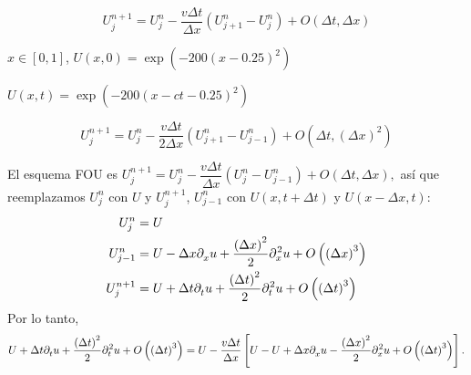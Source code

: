 \begin{example}
	\begin{equation*}
		U^{n+1}_{j}=
		U^{n}_{j}-
		\dfrac{v\Delta t}{\Delta x}
		\left(U^{n}_{j+1}-U^{n}_{j}\right)+
		O\left(\Delta t,\Delta x\right)
	\end{equation*}
\end{example}


$x\in\left[0,1\right]$, $U\left(x,0\right)=\exp\left(-200{\left(x-0.25\right)}^{2}\right)$

$U\left(x,t\right)=\exp\left(-200{\left(x-ct-0.25\right)}^{2}\right)$

\begin{example}
	\begin{equation*}
		U^{n+1}_{j}=
		U^{n}_{j}-
		\dfrac{v\Delta t}{2\Delta x}
		\left(U^{n}_{j+1}-U^{n}_{j-1}\right)+
		O\left(\Delta t,{\left(\Delta x\right)}^{2}\right)
	\end{equation*}
\end{example}

El esquema FOU es
\begin{math}
	U^{n+1}_{j}=
	U^{n}_{j}-
	\dfrac{v\Delta t}{\Delta x}
	\left(U^{n}_{j}-U^{n}_{j-1}\right)+
	O\left(\Delta t,\Delta x\right),
\end{math}
así que reemplazamos $U^{n}_{j}$ con $U$ y $U^{n+1}_{j}$, $U^{n}_{j-1}$ con $U\left(x, t+\Delta t\right)$ y $U\left(x-\Delta x, t\right)$:
\begin{align*}
	U^{n}_{j}   & =
	U                                         \\
	U^{n}_{j-1} & =
	U-
	\Delta x\difcp{u}{x}+
	\dfrac{{\left(\Delta x\right)}^{2}}{2}
	\difcp[2]{u}{x}+
	O\left({\left(\Delta x\right)}^{3}\right) \\
	U^{n+1}_{j} & =
	U+
	\Delta t\difcp{u}{t}+
	\dfrac{{\left(\Delta t\right)}^{2}}{2}
	\difcp[2]{u}{t}+
	O\left({\left(\Delta t\right)}^{3}\right)
\end{align*}
Por lo tanto,
\begin{equation*}
	U+
	\Delta t\difcp{u}{t}+
	\dfrac{{\left(\Delta t\right)}^{2}}{2}
	\difcp[2]{u}{t}+
	O\left({\left(\Delta t\right)}^{3}\right)=
	U-
	\dfrac{v\Delta t}{\Delta x}
	\left[
		U-
		U+
		\Delta x \difcp{u}{x}-
		\dfrac{{\left(\Delta x\right)}^{2}}{2}\difcp[2]{u}{x}+
		O\left({\left(\Delta t\right)}^{3}\right)
		\right].
\end{equation*}

